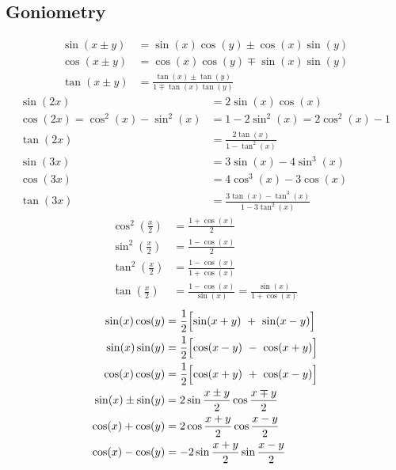 \subsection{Goniometry}
\begin{align*}
    \sin(x\pm y) & =\sin(x)\cos(y)\pm\cos(x)\sin(y)              \\
    \cos(x\pm y) & =\cos(x)\cos(y)\mp\sin(x)\sin(y)              \\
    \tan(x\pm y) & =\frac{\tan(x)\pm\tan(y)}{1\mp\tan(x)\tan(y)}
\end{align*}
\begin{align*}
    \sin(2x)                     & =2\sin(x)\cos(x)                         \\
    \cos(2x)=\cos^2(x)-\sin^2(x) & =1-2\sin^2(x)=2\cos^2(x)-1               \\
    \tan(2x)                     & =\frac{2\tan(x)}{1-\tan^2(x)}            \\
    \sin(3x)                     & =3\sin(x)-4\sin^3(x)                     \\
    \cos(3x)                     & =4\cos^3(x)-3\cos(x)                     \\
    \tan(3x)                     & =\frac{3\tan(x)-\tan^3(x)}{1-3\tan^2(x)}
\end{align*}
\begin{align*}
    \cos^2\left(\frac x2\right)    & =\frac{1+\cos(x)}{2}                                 \\
    \sin^2\left(\frac x2\right)    & =\frac{1-\cos(x)}{2}                                 \\
    \tan^2\left(\frac{x}{2}\right) & =\frac{1-\cos(x)}{1+\cos(x)}                         \\
    \tan\left(\frac x2\right)      & =\frac{1-\cos(x)}{\sin(x)}=\frac{\sin(x)}{1+\cos(x)}
\end{align*}
\begin{align*}
    \sin(x)\cos(y)    & =\frac12\Bigl[\sin(x+y)~+~\sin(x-y)\Bigr]   \\
    \sin(x)\sin(y)    & =\frac12\Bigl[\cos(x-y)~-~\cos(x+y)\Bigr]   \\
    \cos(x)\cos(y)    & =\frac12\Bigl[\cos(x+y)~+~\cos(x-y)\Bigr]   \\
    \sin(x)\pm\sin(y) & =2\sin\frac{x\pm y}{2}\cos\frac{x \mp y}{2} \\
    \cos(x)+\cos(y)   & =2\cos\frac{x+y}{2}\cos\frac{x-y}{2}        \\
    \cos(x)-\cos(y)   & =-2\sin\frac{x+y}{2}\sin\frac{x-y}{2}
\end{align*}

